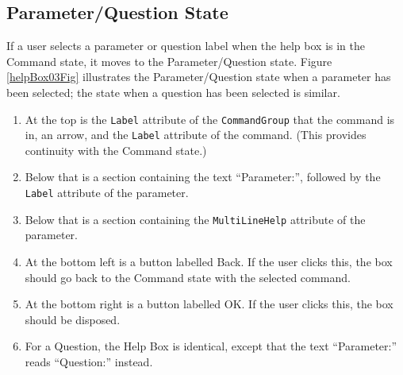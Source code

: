 \documentclass[11pt]{article}
\begin{document}
\subsection{Parameter/Question State}

If a user selects a parameter or question label when the help box is in the
Command state, it moves to the Parameter/Question state.
Figure \ref{helpBox03Fig} illustrates the Parameter/Question state when
a parameter has been selected; the state when a question has been selected
is similar.
\begin{enumerate}
\item At the top is the {\tt Label} attribute of the {\tt CommandGroup}
  that the command is in, an arrow, and the {\tt Label} attribute of the
  command.  (This provides continuity with the Command state.)
\item Below that is a section containing the text ``Parameter:'',
  followed by the {\tt Label} attribute of the parameter.
\item Below that is a section containing the {\tt MultiLineHelp} attribute
  of the parameter.
\item At the bottom left is a button labelled Back.  If the user
  clicks this, the box should go back to the Command state with the
  selected command.
\item At the bottom right is a button labelled OK.  If the user
  clicks this, the box should be disposed.
\item For a Question, the Help Box is identical, except that the text
  ``Parameter:'' reads ``Question:'' instead.
\end{enumerate}
\end{document}
